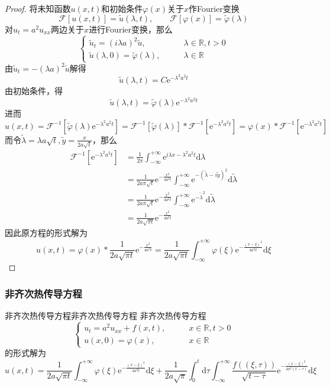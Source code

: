 \documentclass[lang = cn, scheme = chinese, thmcnt = section]{elegantbook}
\newcommand{\R}{\mathbb{R}}            %
\newcommand{\dd}{\mathrm{d}}           %
\newcommand{\ee}[1]{\mathrm{e}^{#1}}   %
\begin{document}
\begin{proof}
	将未知函数$u(x,t)$和初始条件$\varphi(x)$关于$x$作Fourier变换%
	$$
	\mathscr{F}[u(x,t)]=\tilde{u}(\lambda,t),\qquad
	\mathscr{F}[\varphi(x)]=\tilde{\varphi}(\lambda) 
	$$
	对$u_t=a^2u_{xx}$两边关于$x$进行Fourier变换，那么
	$$
	\begin{cases}
		\tilde{u}_t=(i\lambda a)^2\tilde{u},\qquad & \lambda\in\R,t>0\\
		\tilde{u}(\lambda,0)=\tilde{\varphi}(\lambda),\qquad & \lambda\in\R
	\end{cases}
	$$
	由$\tilde{u}_t=-(\lambda a)^2\tilde{u}$解得%
	$$
	\tilde{u}(\lambda,t)=C\ee{-\lambda^2a^2t}
	$$
	由初始条件，得%
	$$
	\tilde{u}(\lambda,t)=\tilde{\varphi}(\lambda)\ee{-\lambda^2a^2t}
	$$
	进而%
	$$
	u(x,t)=\mathscr{F}^{-1}\left[\tilde{\varphi}(\lambda)\ee{-\lambda^2a^2t}\right]
	=\mathscr{F}^{-1}[\tilde{\varphi}(\lambda)]*
	\mathscr{F}^{-1}\left[\ee{-\lambda^2a^2t}\right]
	=\varphi(x)*\mathscr{F}^{-1}\left[\ee{-\lambda^2a^2t}\right]
	$$
	而令$\tilde{\lambda}=\lambda a\sqrt{t},\tilde{y}=\frac{x}{2a\sqrt{t}}$，那么
	\begin{align*}
		\mathscr{F}^{-1}\left[\ee{-\lambda^2a^2t}\right]
		& =\frac{1}{2\pi}\int_{-\infty}^{+\infty}\ee{i\lambda x-\lambda^2a^2t}\dd\lambda\\
		& =\frac{1}{2a\pi\sqrt{t}}\ee{-\frac{x^2}{4a^2t}}\int_{-\infty}^{+\infty}\ee{-(\tilde{\lambda}-i\tilde{y})^2}\dd\tilde{\lambda}\\
		& =\frac{1}{2a\pi\sqrt{t}}\ee{-\frac{x^2}{4a^2t}}\int_{-\infty}^{+\infty}\ee{-\tilde{\lambda}^2}\dd\tilde{\lambda}\\
		& =\frac{1}{2a\sqrt{\pi t}}\ee{-\frac{x^2}{4a^2t}}
	\end{align*}
	因此原方程的形式解为%
	$$
	u(x,t)=\varphi(x)*\frac{1}{2a\sqrt{\pi t}}\ee{-\frac{x^2}{4a^2t}}
	=\frac{1}{2a\sqrt{\pi t}}\int_{-\infty}^{+\infty}\varphi(\xi)\ee{-\frac{(x-\xi)^2}{4a^2t}}\dd\xi
	$$
\end{proof}

\subsubsection{非齐次热传导方程}

\begin{theorem}{非齐次热传导方程}{非齐次热传导方程}
	非齐次热传导方程
	$$
	\begin{cases}
		u_t=a^2u_{xx}+f(x,t),\qquad & x\in\R,t>0\\
		u(x,0)=\varphi(x),\qquad & x\in\R
	\end{cases}
	$$
	的形式解为
	$$
	u(x,t)=\frac{1}{2a\sqrt{\pi t}}\int_{-\infty}^{+\infty}\varphi(\xi)\ee{-\frac{(x-\xi)^2}{4a^2t}}\dd\xi
	+\frac{1}{2a\sqrt{\pi}}\int_{0}^{t}\dd\tau\int_{-\infty}^{+\infty}\frac{f((\xi,\tau))}{\sqrt{t-\tau}}\ee{-\frac{(x-\xi)^2}{4a^2(t-\tau)}}\dd\xi
	$$
\end{theorem}
\end{document}
